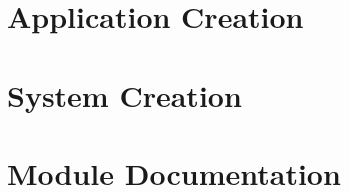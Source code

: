 \newpage

\section{Application Creation}

\newpage

\section{System Creation}

\section{Module Documentation}

\newpage
